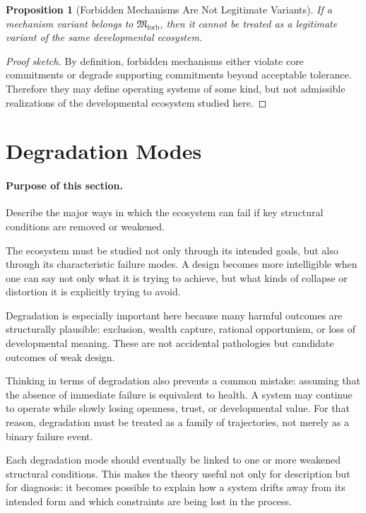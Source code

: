 \documentclass[11pt]{article}
\newtheorem{proposition}{Proposition}
\begin{document}
\begin{proposition}[Forbidden Mechanisms Are Not Legitimate Variants]
If a mechanism variant belongs to \(\mathfrak{M}_{\mathrm{forb}}\), then it cannot be treated as a legitimate variant of the same developmental ecosystem.
\end{proposition}

\begin{proof}[Proof sketch]
By definition, forbidden mechanisms either violate core commitments or degrade supporting commitments beyond acceptable tolerance. Therefore they may define operating systems of some kind, but not admissible realizations of the developmental ecosystem studied here.
\end{proof}

\section{Degradation Modes}

\paragraph{Purpose of this section.}
Describe the major ways in which the ecosystem can fail if key structural conditions are removed or weakened.

The ecosystem must be studied not only through its intended goals, but also through its characteristic failure modes. A design becomes more intelligible when one can say not only what it is trying to achieve, but what kinds of collapse or distortion it is explicitly trying to avoid.

Degradation is especially important here because many harmful outcomes are structurally plausible: exclusion, wealth capture, rational opportunism, or loss of developmental meaning. These are not accidental pathologies but candidate outcomes of weak design.

Thinking in terms of degradation also prevents a common mistake: assuming that the absence of immediate failure is equivalent to health. A system may continue to operate while slowly losing openness, trust, or developmental value. For that reason, degradation must be treated as a family of trajectories, not merely as a binary failure event.

Each degradation mode should eventually be linked to one or more weakened structural conditions. This makes the theory useful not only for description but for diagnosis: it becomes possible to explain how a system drifts away from its intended form and which constraints are being lost in the process.
\end{document}
